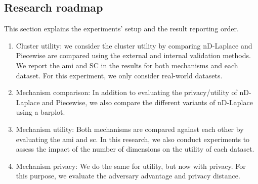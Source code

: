 \begin{enumerate}
\subsection{Research roadmap} \label{research-roadmap}
This section explains the experiments' setup and the result reporting order.
\begin{enumerate}
    \item Cluster utility: we consider the cluster utility by comparing nD-Laplace and Piecewise are compared using the external and internal validation methods.
          We report the \gls{ami} and SC in the results for both mechanisms and each dataset.
          For this experiment, we only consider real-world datasets.
    \item Mechanism comparison: In addition to evaluating the privacy/utility of nD-Laplace and Piecewise, we also compare the different variants of nD-Laplace using a barplot.
    \item Mechanism utility: Both mechanisms are compared against each other by evaluating the \gls{ami} and \gls{sc}.
          In this research, we also conduct experiments to assess the impact of the number of dimensions on the utility of each dataset.
    \item Mechanism privacy: We do the same for utility, but now with privacy.
          For this purpose, we evaluate the adversary advantage and privacy distance.

\end{enumerate}


\end{enumerate}
